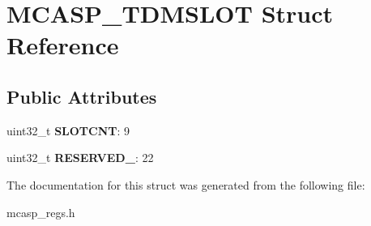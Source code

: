 \hypertarget{structMCASP__TDMSLOT}{\section{M\-C\-A\-S\-P\-\_\-\-T\-D\-M\-S\-L\-O\-T Struct Reference}
\label{structMCASP__TDMSLOT}
}
\subsection*{Public Attributes}
\begin{DoxyCompactItemize}
\item 
\hypertarget{structMCASP__TDMSLOT_afcaf712efb9fa3a26e60e7c8278050a4}{uint32\-\_\-t {\bfseries S\-L\-O\-T\-C\-N\-T}\-: 9}\label{structMCASP__TDMSLOT_afcaf712efb9fa3a26e60e7c8278050a4}

\item 
\hypertarget{structMCASP__TDMSLOT_a5ae4712d3027a8931dd64a795a8c4a5b}{uint32\-\_\-t {\bfseries R\-E\-S\-E\-R\-V\-E\-D\-\_}\-: 22}\label{structMCASP__TDMSLOT_a5ae4712d3027a8931dd64a795a8c4a5b}

\end{DoxyCompactItemize}


The documentation for this struct was generated from the following file\-:\begin{DoxyCompactItemize}
\item 
mcasp\-\_\-regs.\-h\end{DoxyCompactItemize}

